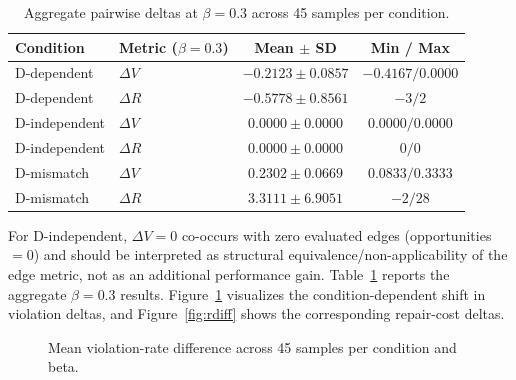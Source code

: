 \documentclass[11pt,a4paper]{article}
\begin{document}
\begin{table}[t]
\centering
\caption{Aggregate pairwise deltas at \(\beta=0.3\) across 45 samples per condition.}
\label{tab:main_results}
\begin{tabular}{@{}llcc@{}}
\toprule
Condition & Metric (\(\beta=0.3\)) & Mean $\pm$ SD & Min / Max \\
\midrule
D-dependent & $\Delta V$ & $-0.2123 \pm 0.0857$ & $-0.4167 / 0.0000$ \\
D-dependent & $\Delta R$ & $-0.5778 \pm 0.8561$ & $-3 / 2$ \\
D-independent & $\Delta V$ & $0.0000 \pm 0.0000$ & $0.0000 / 0.0000$ \\
D-independent & $\Delta R$ & $0.0000 \pm 0.0000$ & $0 / 0$ \\
D-mismatch & $\Delta V$ & $0.2302 \pm 0.0669$ & $0.0833 / 0.3333$ \\
D-mismatch & $\Delta R$ & $3.3111 \pm 6.9051$ & $-2 / 28$ \\
\bottomrule
\end{tabular}
\end{table}
For D-independent, \(\Delta V=0\) co-occurs with zero evaluated edges (opportunities \(=0\)) and should be interpreted as structural equivalence/non-applicability of the edge metric, not as an additional performance gain.
Table~\ref{tab:main_results} reports the aggregate \(\beta=0.3\) results. Figure~\ref{fig:vdiff} visualizes the condition-dependent shift in violation deltas, and Figure~\ref{fig:rdiff} shows the corresponding repair-cost deltas.

\begin{figure}[t]
\centering
{}
\caption{Mean violation-rate difference across 45 samples per condition and beta.}
\label{fig:vdiff}
\end{figure}
\end{document}
